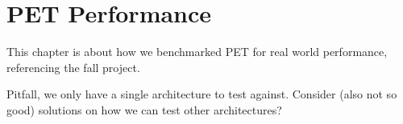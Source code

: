 \chapter{PET Performance}

This chapter is about how we benchmarked PET for real world performance, referencing the fall project.

Pitfall, we only have a single architecture to test against. Consider (also not so good) solutions on how we can test other architectures?




